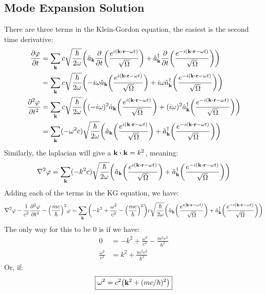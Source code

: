 \documentclass[12pt]{article}
\begin{document}
\subsection{Mode Expansion Solution}
There are three terms in the Klein-Gordon equation, the easiest is the second time derivative:
\begin{align*}
  \pdv{\varphi}{t}&=
  \sum_{\vb{k}}c\sqrt{\frac{\hbar}{2\omega}}
  \qty(\hat{a}_{\vb{k}}
  \pdv{t}\qty(\frac{e^{i(\vb{k\vdot r}-\omega t)}}{\sqrt{\Omega}})
  +\hat{a}^\dag_{\vb{k}}
  \pdv{t}\qty(\frac{e^{-i(\vb{k\vdot r}-\omega t)}}{\sqrt{\Omega}}))\\
  &=\sum_{\vb{k}}c\sqrt{\frac{\hbar}{2\omega}}
  \qty(-i\omega\hat{a}_{\vb{k}}
  \qty(\frac{e^{i(\vb{k\vdot r}-\omega t)}}{\sqrt{\Omega}})
  +i\omega\hat{a}^\dag_{\vb{k}}
  \qty(\frac{e^{-i(\vb{k\vdot r}-\omega t)}}{\sqrt{\Omega}}))\\
  \pdv[2]{\varphi}{t}&=\sum_{\vb{k}}c\sqrt{\frac{\hbar}{2\omega}}
  \qty((-i\omega)^2\hat{a}_{\vb{k}}
  \qty(\frac{e^{i(\vb{k\vdot r}-\omega t)}}{\sqrt{\Omega}})
  +(i\omega)^2\hat{a}^\dag_{\vb{k}}
  \qty(\frac{e^{-i(\vb{k\vdot r}-\omega t)}}{\sqrt{\Omega}}))\\
  &=\sum_{\vb{k}}(-\omega^2c)\sqrt{\frac{\hbar}{2\omega}}
  \qty(\hat{a}_{\vb{k}}
  \qty(\frac{e^{i(\vb{k\vdot r}-\omega t)}}{\sqrt{\Omega}})
  +\hat{a}^\dag_{\vb{k}}
  \qty(\frac{e^{-i(\vb{k\vdot r}-\omega t)}}{\sqrt{\Omega}}))
\end{align*}
Similarly, the laplacian will give a $\vb{k}\vdot\vb{k}=k^2$, meaning:
\begin{align*}
  \laplacian{\varphi}=\sum_{\vb{k}}(-k^2c)\sqrt{\frac{\hbar}{2\omega}}
  \qty(\hat{a}_{\vb{k}}
  \qty(\frac{e^{i(\vb{k\vdot r}-\omega t)}}{\sqrt{\Omega}})
  +\hat{a}^\dag_{\vb{k}}
  \qty(\frac{e^{-i(\vb{k\vdot r}-\omega t)}}{\sqrt{\Omega}}))
\end{align*}
Adding each of the terms in the KG equation, we have:
\begin{align*}
  \laplacian{\varphi}-\frac1{c^2}\pdv[2]{\varphi}{t}
  -\qty(\frac{mc}{\hbar})^2\varphi=
  \sum_{\vb{k}}\qty(-k^2+\frac{\omega^2}{c^2}-\qty(\frac{mc}{\hbar})^2)c
  \sqrt{\frac{\hbar}{2\omega}}\qty(\hat{a}_{\vb{k}}
  \qty(\frac{e^{i(\vb{k\vdot r}-\omega t)}}{\sqrt{\Omega}})
  +\hat{a}^\dag_{\vb{k}}
  \qty(\frac{e^{-i(\vb{k\vdot r}-\omega t)}}{\sqrt{\Omega}}))
\end{align*}
The only way for this to be $0$ is if we have:
\begin{align*}
  0&=-k^2+\frac{\omega^2}{c^2}-\frac{m^2c^2}{\hbar^2}\\
  \frac{\omega^2}{c^2}&=k^2+\frac{m^2c^2}{\hbar^2}
\end{align*}
Or, if:
\begin{align}
  \boxed{\omega^2=c^2\qty(\vb{k}^2+(mc/\hbar)^2)}
\end{align}
\end{document}
